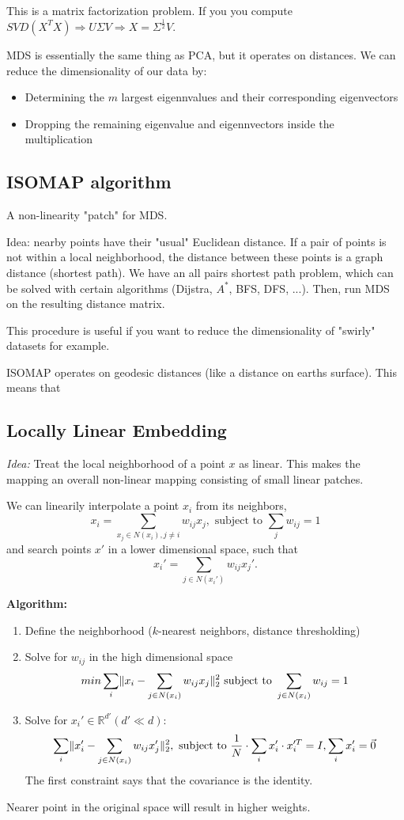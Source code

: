 \documentclass{scrartcl}
\DeclarePairedDelimiter\norm{\lVert}{\rVert}%
\begin{document}
This is a matrix factorization problem. If you you compute \(SVD(X^T X) \Rightarrow U \Sigma V \Rightarrow X = \Sigma^{\frac{1}{2}} V\).

MDS is essentially the same thing as PCA, but it operates on distances. We can reduce the dimensionality of our data by:
\begin{itemize}
    \item
        Determining the \(m\) largest eigennvalues and their corresponding eigenvectors
    \item
        Dropping the remaining eigenvalue and eigennvectors inside the multiplication
\end{itemize}

\subsection{ISOMAP algorithm}
A non-linearity "patch" for MDS. 

Idea: nearby points have their "usual" Euclidean distance. If a pair of points is not within a local neighborhood, the distance between these points is a graph distance (shortest path). We have an all pairs shortest path problem, which can be solved with certain algorithms (Dijstra, \(A^*\), BFS, DFS, ...). Then, run MDS on the resulting distance matrix. 

This procedure is useful if you want to reduce the dimensionality of "swirly" datasets for example.

ISOMAP operates on geodesic distances (like a distance on earths surface). This means that 

\subsection{Locally Linear Embedding}
\textit{Idea:} Treat the local neighborhood of a point \(x\) as linear. This makes the mapping an overall non-linear mapping consisting of small linear patches.

We can linearily interpolate a point \(x_i\) from its neighbors,
\[x_i = \sum_{x_j \in N(x_i), j \neq i} w_{ij} x_j, \text{ subject to } \sum_j w_{ij} = 1\]
and search points \(x'\) in a lower dimensional space, such that
\[x_i' = \sum_{j \in N(x_i')} w_{ij} x_j'.\]

\textbf{Algorithm:}
\begin{enumerate}
    \item
        Define the neighborhood (\(k\)-nearest neighbors, distance thresholding) 
    \item
        Solve for \(w_{ij}\) in the high dimensional space 
        \[min \sum_{i}\norm{x_i - \sum_{j\in N(x_i)} w_{ij} x_j}_2^2 \text{ subject to } \sum_{j \in N(x_i)} w_{ij} = 1\]%
    \item
        Solve for \(x_i' \in \mathbb{R}^{d'} (d' \ll d)\):
        \[\sum_i \norm{x_i' - \sum_{j \in N(x_i)} w_{ij} x_j'}_2^2, \text{ subject to } \frac{1}{N} \cdot \sum_i x_i' \cdot x_i'^T = I, \sum_i x_i' = \vec{0}\]
        The first constraint says that the covariance is the identity.
\end{enumerate}
Nearer point in the original space will result in higher weights.
\end{document}
